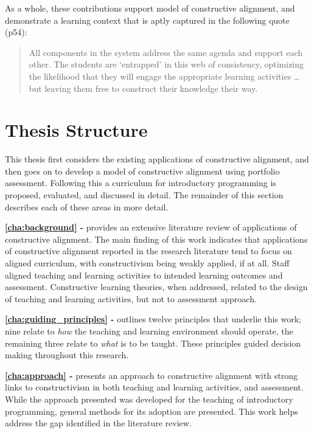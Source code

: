 As a whole, these contributions support \citet{Biggs:1996c} model of constructive alignment, and demonstrate a learning context that is aptly captured in the following quote \citep{Biggs:2007} (p54):

\begin{quote}
	All components in the system address the same agenda and support each other. The students are `entrapped' in this web of consistency, optimizing the likelihood that they will engage the appropriate learning activities \ldots but leaving them free to construct their knowledge their way.
\end{quote}



\section{Thesis Structure} %
\label{sec:thesis_structure}

This thesis first considers the existing applications of constructive alignment, and then goes on to develop a model of constructive alignment using portfolio assessment. Following this a curriculum for introductory programming is proposed, evaluated, and discussed in detail. The remainder of this section describes each of these areas in more detail. 

\textbf{\cref{cha:background} - } provides an extensive literature review of applications of constructive alignment. The main finding of this work indicates that applications of constructive alignment reported in the research literature tend to focus on aligned curriculum, with constructivism being weakly applied, if at all. Staff aligned teaching and learning activities to intended learning outcomes and assessment. Constructive learning theories, when addressed, related to the design of teaching and learning activities, but not to assessment approach.

\textbf{\cref{cha:guiding_principles} - } outlines twelve principles that underlie this work; nine relate to \emph{how} the teaching and learning environment should operate, the remaining three relate to \emph{what} is to be taught. These principles guided decision making throughout this research.

\textbf{\cref{cha:approach} - } presents an approach to constructive alignment with strong links to constructivism in both teaching and learning activities, and assessment. While the approach presented was developed for the teaching of introductory programming, general methods for its adoption are presented. This work helps address the gap identified in the literature review.

